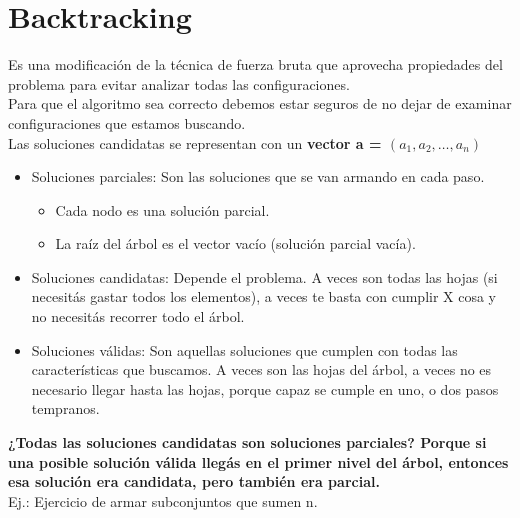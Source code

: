 \documentclass[10pt,a4paper]{article}
\begin{document}
\section*{Backtracking}
Es una modificación de la técnica de fuerza bruta que aprovecha propiedades del problema para evitar analizar todas las configuraciones. \\
Para que el algoritmo sea correcto debemos estar seguros de no dejar de examinar configuraciones que estamos buscando. \\
Las soluciones candidatas se representan con un \textbf{vector a = $(a_{1}, a_{2}, \dots, a_{n})$}
\begin{itemize}
    \item Soluciones parciales: Son las soluciones que se van armando en cada paso. 
    \begin{itemize}
        \item Cada nodo es una solución parcial.
        \item La raíz del árbol es el vector vacío (solución parcial vacía).
    \end{itemize}
    \item Soluciones candidatas: Depende el problema. A veces son todas las hojas (si necesitás gastar todos los elementos), a veces te basta con cumplir X cosa y no necesitás recorrer todo el árbol. 
    \item Soluciones válidas: Son aquellas soluciones que cumplen con todas las características que buscamos. A veces son las hojas del árbol, a veces no es necesario llegar hasta las hojas, porque capaz se cumple en uno, o dos pasos tempranos.
\end{itemize}
\textbf{¿Todas las soluciones candidatas son soluciones parciales? Porque si una posible solución válida llegás en el primer nivel del árbol, entonces esa solución era candidata, pero también era parcial.} \\
Ej.: Ejercicio de armar subconjuntos que sumen n.  
\end{document}

